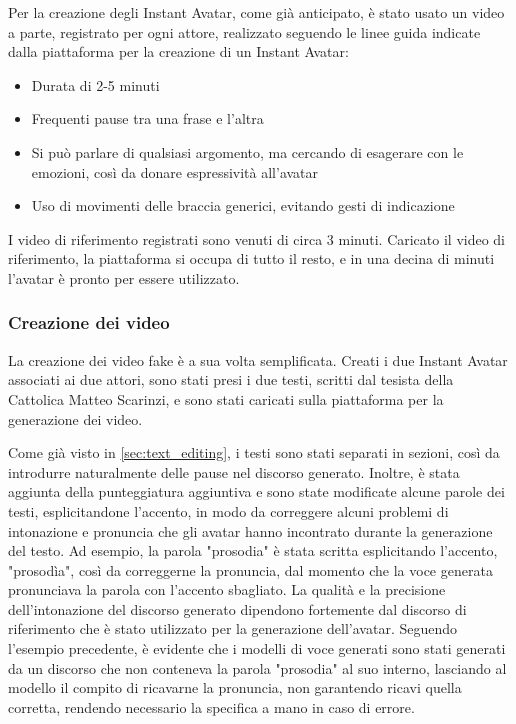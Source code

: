 Per la creazione degli Instant Avatar, come già anticipato, è stato usato un video a parte, registrato per ogni attore, realizzato seguendo le linee guida indicate dalla piattaforma per la creazione di un Instant Avatar:
\begin{itemize}
    \item Durata di 2-5 minuti
    \item Frequenti pause tra una frase e l'altra
    \item Si può parlare di qualsiasi argomento, ma cercando di esagerare con le emozioni, così da donare espressività all'avatar
    \item Uso di movimenti delle braccia generici, evitando gesti di indicazione
\end{itemize}

I video di riferimento registrati sono venuti di circa 3 minuti. Caricato il video di riferimento, la piattaforma si occupa di tutto il resto, e in una decina di minuti l'avatar è pronto per essere utilizzato.

\subsubsection{Creazione dei video}

La creazione dei video fake è a sua volta semplificata. Creati i due Instant Avatar associati ai due attori, sono stati presi i due testi, scritti dal tesista della Cattolica Matteo Scarinzi, e sono stati caricati sulla piattaforma per la generazione dei video. 

Come già visto in \ref{sec:text_editing}, i testi sono stati separati in sezioni, così da introdurre naturalmente delle pause nel discorso generato. Inoltre, è stata aggiunta della punteggiatura aggiuntiva e sono state modificate alcune parole dei testi, esplicitandone l'accento, in modo da correggere alcuni problemi di intonazione e pronuncia che gli avatar hanno incontrato durante la generazione del testo. Ad esempio, la parola "prosodia" è stata scritta esplicitando l'accento, "prosodìa", così da correggerne la pronuncia, dal momento che la voce generata pronunciava la parola con l'accento sbagliato. La qualità e la precisione dell'intonazione del discorso generato dipendono fortemente dal discorso di riferimento che è stato utilizzato per la generazione dell'avatar. Seguendo l'esempio precedente, è evidente che i modelli di voce generati sono stati generati da un discorso che non conteneva la parola "prosodia" al suo interno, lasciando al modello il compito di ricavarne la pronuncia, non garantendo ricavi quella corretta, rendendo necessario la specifica a mano in caso di errore.

